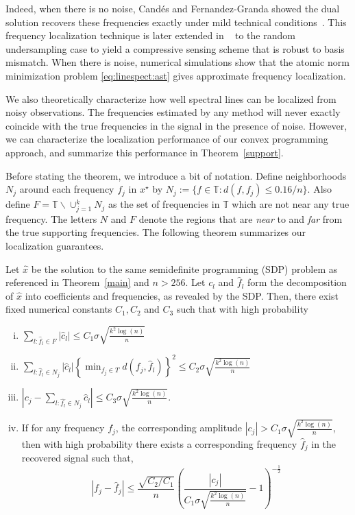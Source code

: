 Indeed, when there is no noise, Cand\'es and Fernandez-Granda showed the dual
solution recovers these frequencies exactly under mild technical
conditions~\cite{CandesGranda}. This frequency localization technique is later
extended in ~\cite{offgrid2012} to the random undersampling case to yield a
compressive sensing scheme that is robust to basis mismatch. When there is
noise, numerical simulations show that the atomic norm minimization problem
\eqref{eq:linespect:ast} gives approximate frequency localization.

We also theoretically characterize how well spectral lines can be localized from noisy observations.  The frequencies estimated by any method will never exactly coincide with the true frequencies in the signal in the presence of noise. However, we can characterize the localization performance of our convex programming approach, and summarize this performance in Theorem~\ref{support}.

Before stating the theorem, we introduce a bit of notation. Define neighborhoods $N_j$ around each frequency $f_j$ in $x^\star$ by $N_j := \{ f \in \mathbb{T} : d(f,f_j) \leq 0.16/n\}$. Also define $F = \mathbb{T}\backslash \cup_{j=1}^k N_j$ as the set of frequencies in $\mathbb{T}$ which are not near any true frequency.  The letters $N$ and $F$ denote the regions that are \emph{near} to and \emph{far} from the true supporting frequencies.  The following theorem summarizes our localization guarantees.

\begin{theorem} \label{support} Let $\hat{x}$ be the solution to the same
semidefinite programming (SDP) problem as referenced in Theorem~\ref{main} and
$n > 256$. Let $\hat{c_l}$ and $\hat{f}_l$ form the decomposition of $\hat{x}$
into coefficients and frequencies, as revealed by the SDP. Then, there exist
fixed numerical constants $C_1,C_2$ and $C_3$ such that with high probability
\begin{enumerate}[i.)] \item $\sum_{l : \hat{f}_l \in F} |\hat{c}_l| \leq C_1
\sigma\sqrt{\frac{k^2 \log(n)}{n}}$ \item $\sum_{l : \hat{f}_l \in N_j}
|\hat{c}_l| \left\{ \min_{f_j \in T} d(f_j,\hat{f}_l) \right\}^2 \leq C_2
\sigma\sqrt{\frac{k^2 \log(n)}{n}}$ \item $\left| c_j - \sum_{l : \hat{f_l} \in
N_j} \hat{c}_l \right| \leq C_3 \sigma\sqrt{\frac{k^2 \log(n)}{n}}$. \item If
for any frequency $f_j$, the corresponding amplitude $|c_j| > C_1 \sigma
\sqrt{\frac{ k^2 \log(n)}{n}}$, then with high probability there exists a
corresponding frequency $\hat{f}_j$ in the recovered signal such that, \[ \left|
f_j - \hat{f}_j \right| \leq \frac{\sqrt{C_2/C_1}}{n}\left(\frac{|c_j|}{C_1
\sigma \sqrt{\frac{ k^2 \log(n)}{n}}} - 1\right)^{-\tfrac{1}{2}} \]
\end{enumerate} \end{theorem}

